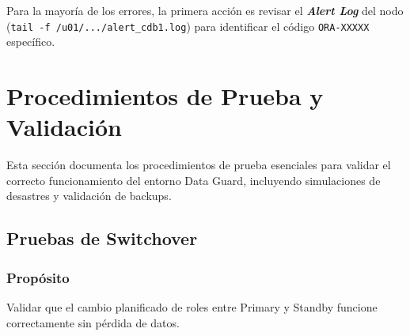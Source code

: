 \documentclass[11pt, a4paper]{report}
\begin{document}
Para la mayoría de los errores, la primera acción es revisar el \textbf{\textit{Alert Log}} del nodo (\texttt{tail -f /u01/.../alert\_cdb1.log}) para identificar el código \texttt{ORA-XXXXX} específico.

\newpage

\chapter{Procedimientos de Prueba y Validación}

Esta sección documenta los procedimientos de prueba esenciales para validar el correcto funcionamiento del entorno Data Guard, incluyendo simulaciones de desastres y validación de backups.

\section{Pruebas de Switchover}

\subsection{Propósito}
Validar que el cambio planificado de roles entre Primary y Standby funcione correctamente sin pérdida de datos.
\end{document}
